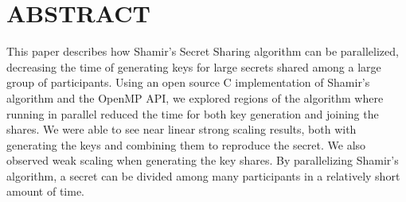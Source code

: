 \documentclass[main.tex]{subfiles}
\begin{document}
\section{ABSTRACT} \label{sec1}

\indent This paper describes how Shamir's Secret Sharing algorithm can be parallelized, decreasing the time of generating keys for large secrets shared among a large group of participants.  Using an open source C implementation of Shamir's algorithm and the OpenMP API, we explored regions of the algorithm where running in parallel reduced the time for both key generation and joining the shares.  We were able to see near linear strong scaling results, both with generating the keys and combining them to reproduce the secret. We also observed weak scaling when generating the key shares.  By parallelizing Shamir's algorithm, a secret can be divided among many participants in a relatively short amount of time. 
\end{document}
